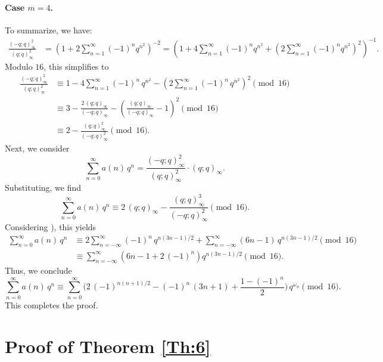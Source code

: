 \documentclass{article}
\begin{document}
    \paragraph{Case $m=4$.} To summarize, we have:
\begin{align*}
\frac{(-q;q)_\infty^2}{(q;q)_\infty^2} 
&= \left( 1 + 2 \sum_{n=1}^\infty (-1)^n q^{n^2} \right)^{-2}
= \left(1 + 4 \sum_{n=1}^\infty (-1)^n q^{n^2} + \left( 2 \sum_{n=1}^\infty (-1)^n q^{n^2} \right)^2 \right)^{-1}.
\end{align*}
Modulo $16$, this simplifies to
    \begin{align*}
        \frac{(-q;q)_\infty^2}{(q;q)_\infty^2} 
        & \equiv 1-4\sum_{n=1}^\infty (-1)^n\,q^{n^2} - \left( 2\sum_{n=1}^\infty (-1)^n\,q^{n^2} \right)^2  \pmod {16} \\
        & \equiv 3-\frac{2\,(q;q)_\infty}{(-q;q)_\infty}-\left(\frac{(q;q)_\infty}{(-q;q)_\infty}-1 \right)^2 \pmod {16} \\
        & \equiv 2-\frac{(q;q)_\infty^2}{(-q;q)_\infty^2} \pmod {16}.
    \end{align*}
Next, we consider
$$
\sum_{n=0}^\infty a(n)\,q^n = \frac{(-q;q)_\infty^2}{(q;q)_\infty^2} \cdot (q;q)_\infty.
$$
Substituting, we find
$$
\sum_{n=0}^\infty a(n)\, q^n \equiv 2\, (q;q)_\infty - \frac{(q;q)_\infty^3}{(-q;q)_\infty^2} \pmod{16}.
$$
Considering \cite[eq. (32.6)]{Fine}), this yields
\begin{align*}
\sum_{n=0}^\infty a(n)\, q^n 
& \equiv 2 \sum_{n=-\infty}^\infty (-1)^n\, q^{n(3n-1)/2} + \sum_{n=-\infty}^\infty (6n-1)\, q^{n(3n-1)/2} \pmod{16}\\
& \equiv \sum_{n=-\infty}^\infty \left(6n - 1 + 2\,(-1)^n \right) q^{n(3n-1)/2}\pmod{16}.
\end{align*}
Thus, we conclude
$$\sum_{n=0}^\infty a(n)\, q^n \equiv \sum_{n=0}^\infty \bigg( 2\,(-1)^{n(n+1)/2} - (-1)^n\,(3n+1) + \frac{1-(-1)^n}{2} \bigg) \, q^{\omega_n} \pmod{16}.$$
This completes the proof.


\section{Proof of Theorem \ref{Th:6}} \label{S5}
\end{document}
